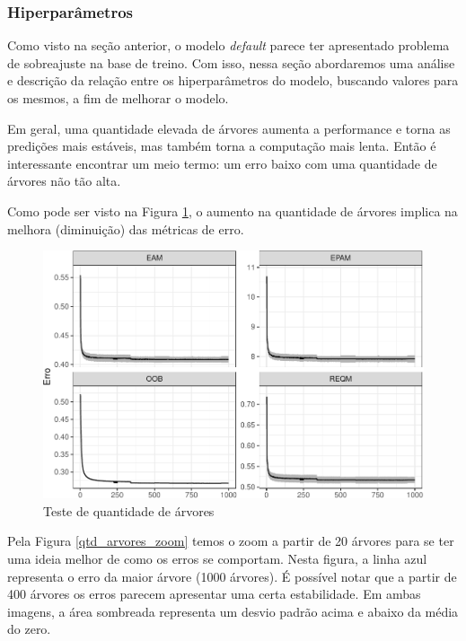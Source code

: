 \documentclass[
	12pt,				%
	a4paper,		%
	oneside,    %
	chapter=TITLE,		   %
	section=TITLE,		   %
	subsection=TITLE,	   %
	subsubsection=TITLE, %
	english,			%
	french,				%
	spanish,			%
	brazil,				%
]{abntex2}
\begin{document}
\hypertarget{hiperparuxe2metros}{%
\subsubsection{Hiperparâmetros}\label{hiperparuxe2metros}}

Como visto na seção anterior, o modelo \emph{default} parece ter
apresentado problema de sobreajuste na base de treino. Com isso, nessa
seção abordaremos uma análise e descrição da relação entre os
hiperparâmetros do modelo, buscando valores para os mesmos, a fim de
melhorar o modelo.

Em geral, uma quantidade elevada de árvores aumenta a performance e
torna as predições mais estáveis, mas também torna a computação mais
lenta. Então é interessante encontrar um meio termo: um erro baixo com
uma quantidade de árvores não tão alta.

Como pode ser visto na Figura \ref{qtd_arvores}, o aumento na quantidade
de árvores implica na melhora (diminuição) das métricas de erro.

\begin{figure}
\centering
\includegraphics{00-TCC_files/figure-latex/qtd_arvores-1.pdf}
\caption{\label{qtd_arvores}Teste de quantidade de árvores}
\end{figure}

Pela Figura \ref{qtd_arvores_zoom} temos o zoom a partir de 20 árvores
para se ter uma ideia melhor de como os erros se comportam. Nesta
figura, a linha azul representa o erro da maior árvore (1000 árvores). É
possível notar que a partir de 400 árvores os erros parecem apresentar
uma certa estabilidade. Em ambas imagens, a área sombreada representa um
desvio padrão acima e abaixo da média do zero.
\end{document}
